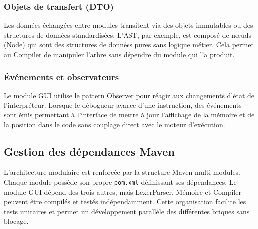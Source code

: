 \subsubsection{Objets de transfert (DTO)}

Les données échangées entre modules transitent via des objets immutables ou des structures de données standardisées. L'AST, par exemple, est composé de nœuds (Node) qui sont des structures de données pures sans logique métier. Cela permet au Compiler de manipuler l'arbre sans dépendre du module qui l'a produit.

\subsubsection{Événements et observateurs}

Le module GUI utilise le pattern Observer pour réagir aux changements d'état de l'interpréteur. Lorsque le débogueur avance d'une instruction, des événements sont émis permettant à l'interface de mettre à jour l'affichage de la mémoire et de la position dans le code sans couplage direct avec le moteur d'exécution.

\subsection{Gestion des dépendances Maven}

L'architecture modulaire est renforcée par la structure Maven multi-modules. Chaque module possède son propre \texttt{pom.xml} définissant ses dépendances. Le module GUI dépend des trois autres, mais LexerParser, Mémoire et Compiler peuvent être compilés et testés indépendamment. Cette organisation facilite les tests unitaires et permet un développement parallèle des différentes briques sans blocage.
